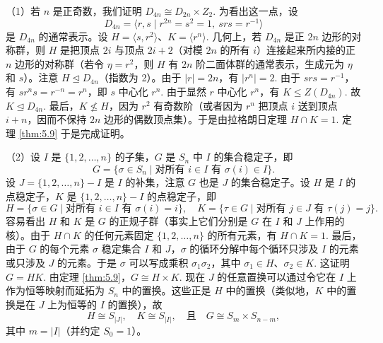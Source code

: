 \begin{example}
（1）若 \(n\) 是正奇数，我们证明 \(D_{4n} \cong D_{2n} \times Z_2\). 为看出这一点，设
\[
D_{4n} = \langle r, s \mid r^{2n} = s^2 = 1,\ srs = r^{-1} \rangle
\]
是 \(D_{4n}\) 的通常表示。设 \(H = \langle s, r^2 \rangle\)、\(K = \langle r^n \rangle\). 几何上，若 \(D_{4n}\) 是正 \(2n\) 边形的对称群，则 \(H\) 是把顶点 \(2i\) 与顶点 \(2i+2\)（对模 \(2n\) 的所有 \(i\)）连接起来所内接的正 \(n\) 边形的对称群（若令 \(\eta = r^2\)，则 \(H\) 有 \(2n\) 阶二面体群的通常表示，生成元为 \(\eta\) 和 \(s\)）。注意 \(H \trianglelefteq D_{4n}\)（指数为 2）。由于 \(|r| = 2n\)，有 \(|r^n| = 2\). 由于 \(srs = r^{-1}\)，有 \(sr^ns = r^{-n} = r^n\)，即 \(s\) 中心化 \(r^n\). 由于显然 \(r\) 中心化 \(r^n\)，有 \(K \leq Z(D_{4n})\). 故 \(K \trianglelefteq D_{4n}\). 最后，\(K \not\leq H\)，因为 \(r^2\) 有奇数阶（或者因为 \(r^n\) 把顶点 \(i\) 送到顶点 \(i+n\)，因而不保持 \(2n\) 边形的偶数顶点集）。于是由拉格朗日定理 \(H \cap K = 1\). 定理 \ref{thm:5.9} 于是完成证明。

（2）设 \(I\) 是 \(\{1, 2, \ldots, n\}\) 的子集，\(G\) 是 \(S_n\) 中 \(I\) 的集合稳定子，即
\[
G = \{\sigma \in S_n \mid \text{对所有 } i \in I \text{ 有 } \sigma(i) \in I\}.
\]
设 \(J = \{1, 2, \ldots, n\} - I\) 是 \(I\) 的补集，注意 \(G\) 也是 \(J\) 的集合稳定子。设 \(H\) 是 \(I\) 的点稳定子，\(K\) 是 \(\{1, 2, \ldots, n\} - I\) 的点稳定子，即
\[
H = \{\sigma \in G \mid \text{对所有 } i \in I \text{ 有 } \sigma(i) = i\}, \quad K = \{\tau \in G \mid \text{对所有 } j \in J \text{ 有 } \tau(j) = j\}.
\]
容易看出 \(H\) 和 \(K\) 是 \(G\) 的正规子群（事实上它们分别是 \(G\) 在 \(I\) 和 \(J\) 上作用的核）。由于 \(H \cap K\) 的任何元素固定 \(\{1, 2, \ldots, n\}\) 的所有元素，有 \(H \cap K = 1\). 最后，由于 \(G\) 的每个元素 \(\sigma\) 稳定集合 \(I\) 和 \(J\)，\(\sigma\) 的循环分解中每个循环只涉及 \(I\) 的元素或只涉及 \(J\) 的元素。于是 \(\sigma\) 可以写成乘积 \(\sigma_1\sigma_2\)，其中 \(\sigma_1 \in H\)、\(\sigma_2 \in K\). 这证明 \(G = HK\). 由定理 \ref{thm:5.9}，\(G \cong H \times K\). 现在 \(J\) 的任意置换可以通过令它在 \(I\) 上作为恒等映射而延拓为 \(S_n\) 中的置换。这些正是 \(H\) 中的置换（类似地，\(K\) 中的置换是在 \(J\) 上为恒等的 \(I\) 的置换），故
\[
H \cong S_{|J|}, \quad K \cong S_{|I|}, \quad \text{且} \quad G \cong S_m \times S_{n-m},
\]
其中 \(m = |I|\)（并约定 \(S_0 = 1\)）。


\end{example}
